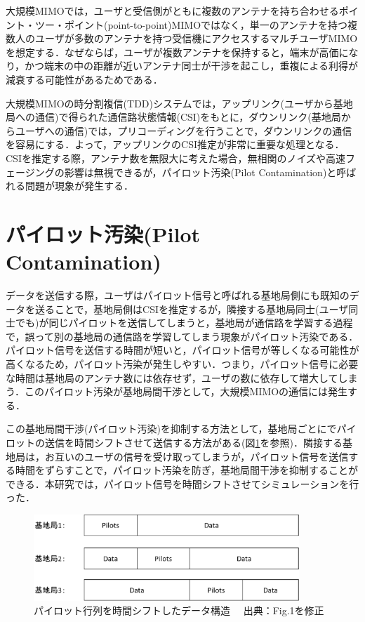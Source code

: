 \documentclass[report]{jsbook}
\begin{document}
大規模MIMOでは，ユーザと受信側がともに複数のアンテナを持ち合わせるポイント・ツー・ポイント(point-to-point)MIMOではなく，単一のアンテナを持つ複数人のユーザが多数のアンテナを持つ受信機にアクセスするマルチユーザMIMOを想定する．なぜならば，ユーザが複数アンテナを保持すると，端末が高価になり，かつ端末の中の距離が近いアンテナ同士が干渉を起こし，重複による利得が減衰する可能性があるためである\cite{Marzetta}．

大規模MIMOの時分割複信(TDD)システムでは，アップリンク(ユーザから基地局への通信)で得られた通信路状態情報(CSI)をもとに，ダウンリンク(基地局からユーザへの通信)では，プリコーディングを行うことで，ダウンリンクの通信を容易にする．よって，アップリンクのCSI推定が非常に重要な処理となる\cite{Khansefid}．CSIを推定する際，アンテナ数を無限大に考えた場合，無相関のノイズや高速フェージングの影響は無視できるが，パイロット汚染(Pilot Contamination)\cite{Marzetta}と呼ばれる問題が現象が発生する．

\section{パイロット汚染(Pilot Contamination)}
\label{sec:pilot_contamination}
データを送信する際，ユーザはパイロット信号と呼ばれる基地局側にも既知のデータを送ることで，基地局側はCSIを推定するが，隣接する基地局同士(ユーザ同士でも)が同じパイロットを送信してしまうと，基地局が通信路を学習する過程で，誤って別の基地局の通信路を学習してしまう現象がパイロット汚染である．パイロット信号を送信する時間が短いと，パイロット信号が等しくなる可能性が高くなるため，パイロット汚染が発生しやすい．つまり，パイロット信号に必要な時間は基地局のアンテナ数には依存せず，ユーザの数に依存して増大してしまう．このパイロット汚染が基地局間干渉として，大規模MIMOの通信には発生する．

この基地局間干渉(パイロット汚染)を抑制する方法として，基地局ごとにでパイロットの送信を時間シフトさせて送信する\cite{Appaiah}方法がある(図\ref{fig:shiftedframe}を参照)．隣接する基地局は，お互いのユーザの信号を受け取ってしまうが，パイロット信号を送信する時間をずらすことで，パイロット汚染を防ぎ，基地局間干渉を抑制することができる．本研究では，パイロット信号を時間シフトさせてシミュレーションを行った．

\begin{figure}[htbp]
  \begin{center}
    \includegraphics[clip,width=10.0cm]{./shiftedframe.eps}
    \caption{パイロット行列を時間シフトしたデータ構造 　出典：\cite{Appaiah}Fig.1を修正}
    \label{fig:shiftedframe}
  \end{center}
\end{figure}
\end{document}
